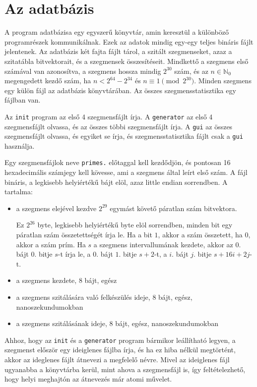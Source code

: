 \section{Az adatbázis}

A program adatbázisa egy egyszerű könyvtár, amin keresztül a különböző programrészek kommunikálnak.
Ezek az adatok mindig egy-egy teljes bináris fájlt jelentenek.
Az adatbázis két fajta fájlt tárol, a szitált szegmenseket, azaz a szitatábla bitvektorait, és a szegmensek összesítéseit.
Mindkettő a szegmens első számával van azonosítva, a szegmens hossza mindig $2^{30}$ szám, és az $n \in \mathbb{N}_0$ megengedett kezdő szám, ha $n < 2^{64}-2^{34}$ és $n \equiv 1 \pmod{2^{30}}$.
Minden szegmens egy külön fájl az adatbázis könyvtárában.
Az összes szegmensstatisztika egy fájlban van.

Az \texttt{init} program az első 4 szegmensfájlt írja.
A \texttt{generator} az első 4 szegmensfájlt olvassa, és az összes többi szegmensfájlt írja.
A \texttt{gui} az összes szegmensfájlt olvassa, és egyiket se írja, és szegmensstatisztika fájlt csak a \texttt{gui} használja.

Egy szegmensfájlok neve \texttt{primes.} előtaggal kell kezdődjön, és pontosan 16 hexadecimális számjegy kell kövesse, ami a szegmens által leírt első szám.
A fájl bináris, a legkisebb helyiértékű bájt elöl, azaz little endian sorrendben.
A tartalma:
\begin{itemize}
\item a szegmens elejével kezdve $2^{29}$ egymást követő páratlan szám bitvektora.
	
Ez $2^{26}$ byte, legkisebb helyiértékű byte elöl sorrendben, minden bit egy páratlan szám összetettségét írja le.
Ha a bit $1$, akkor a szám összetett, ha $0$, akkor a szám prím.
Ha $s$ a szegmens intervallumának kezdete, akkor az $0.$ bájt $0.$ bitje $s$-t írja le, a $0.$ bájt $1.$ bitje $s+2$-t, a $i.$ bájt $j.$ bitje $s+16i+2j$-t.
	
\item a szegmens kezdete, 8 bájt, egész
\item a szegmens szitálására való felkészülés ideje, 8 bájt, egész, nanoszekundumokban
\item a szegmens szitálásának ideje, 8 bájt, egész, nanoszekundumokban
\end{itemize}

Ahhoz, hogy az \texttt{init} és a \texttt{generator} program bármikor leállítható legyen, a szegmenst először egy ideiglenes fájlba írja, és ha ez hiba nélkül megtörtént, akkor az ideglenes fájlt átnevezi a megfelelő névre.
Mivel az ideiglenes fájl ugyanabba a könyvtárba kerül, mint ahova a szegmensfájl is, így feltételezhető, hogy helyi meghajtón az átnevezés már atomi művelet.

